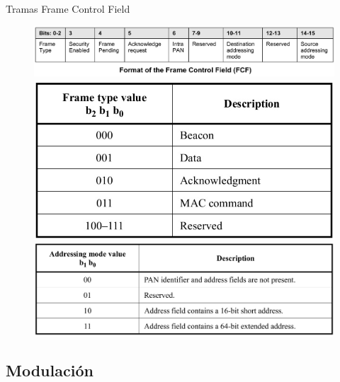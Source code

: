 \documentclass[aspectratio=169, handout]{beamer}
\begin{document}
\begin{frame}[t]{Tramas}
Frame Control Field
	\begin{figure}[H]
	\centering
		\includegraphics[height=.3\textheight]{./imagenes/FCF.jpg}\\
		\vspace{20px}
		\includegraphics[height=.3\textheight]{./imagenes/frametype.jpg}
		\hspace{20px} 
		\includegraphics[height=.3\textheight]{./imagenes/addressingmode.jpg}
	\end{figure} 	
\end{frame}


\subsection[Modulación]{Modulación}
\end{document}
